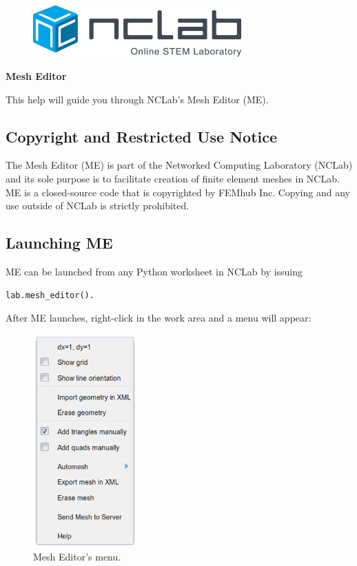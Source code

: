 \documentclass{article}
\begin{document}
\large

\vbox{}
\begin{figure}[!ht]
\includegraphics[width=8cm]{logo.png}
\vspace{4mm}
\end{figure}

\centerline{\huge \bf Mesh Editor}
\vspace{6mm}
\noindent
This help will guide you through NCLab's Mesh Editor (ME).

\subsection*{Copyright and Restricted Use Notice}

The Mesh Editor (ME) is part of the Networked Computing Laboratory (NCLab) and its sole 
purpose is to facilitate creation of finite element meshes in NCLab. ME is a closed-source 
code that is copyrighted by FEMhub Inc. Copying and any use outside of NCLab is strictly 
prohibited.

\subsection*{Launching ME}

ME can be launched from any Python worksheet in NCLab by issuing 

\begin{verbatim}
lab.mesh_editor().
\end{verbatim}
After ME launches, right-click in the work area and a menu will appear:\\

\begin{figure}[!ht]
\begin{center}
\includegraphics[width=4cm]{me-menu.png}
\end{center}
\vspace{-4mm}
\caption{Mesh Editor's menu.}
\end{figure}
\end{document}
